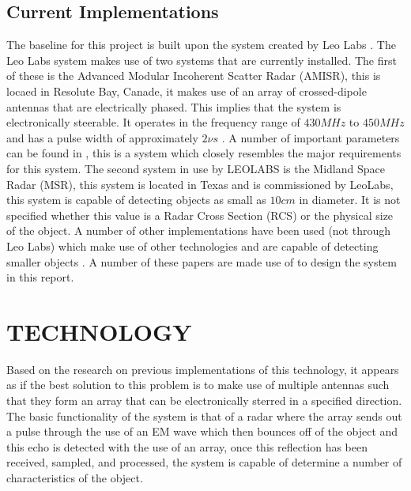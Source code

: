\documentclass[11pt]{witseiepaper}
\begin{document}


\subsection{Current Implementations}
The baseline for this project is built upon the system created by Leo Labs \cite{LEOLABS}. The Leo Labs system makes use of two systems that are currently installed. The first of these is the Advanced Modular Incoherent Scatter Radar (AMISR), this is locaed in Resolute Bay, Canade, it makes use of an array of crossed-dipole antennas that are electrically phased. This implies that the system is electronically steerable. It operates in the frequency range of $430 MHz$ to $450 MHz$ and has a pulse width of approximately $2 \nu s$ \cite{AMISR}. A number of important parameters can be found in \cite{AMISR}, this is a system which closely resembles the major requirements for this system.
The second system in use by LEOLABS is the Midland Space Radar (MSR), this system is located in Texas and is commissioned by LeoLabs, this system is capable of detecting objects as small as $10 cm$ in diameter. It is not specified whether this value is a Radar Cross Section  (RCS) or the physical size of the object.
A number of other implementations have been used (not through Leo Labs) which make use of other technologies and are capable of detecting smaller objects \cite{EISCAT, SIMO, telescope, BeamForming, OrbitDetermination, PlanarArray}. A number of these papers are made use of to design the system in this report.


\section{TECHNOLOGY} \label{sec:TECHNOLOGY}
Based on the research on previous implementations of this technology, it appears as if the best solution to this problem is to make use of multiple antennas such that they form an array that can be electronically sterred in a specified direction.
The basic functionality of the system is that of a radar where the array sends out a pulse through the use of an EM wave which then bounces off of the object and this echo is detected with the use of an array, once this reflection has been received, sampled, and processed, the system is capable of determine a number of characteristics of the object.
\end{document}

